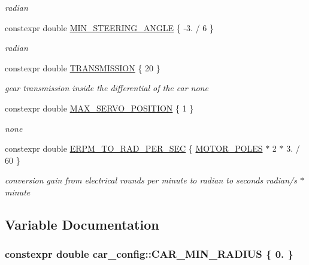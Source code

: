 \begin{DoxyCompactItemize}
\begin{DoxyCompactList}\small\item\em radian \end{DoxyCompactList}\item 
constexpr double \hyperlink{namespacecar__config_a38229ce5d2e17e0c30b86864fb20d9ce}{M\+I\+N\+\_\+\+S\+T\+E\+E\+R\+I\+N\+G\+\_\+\+A\+N\+G\+LE} \{ -\/3. / 6 \}
\begin{DoxyCompactList}\small\item\em radian \end{DoxyCompactList}\item 
constexpr double \hyperlink{namespacecar__config_a7af97a6c9168673aba8917029cfe44d3}{T\+R\+A\+N\+S\+M\+I\+S\+S\+I\+ON} \{ 20 \}
\begin{DoxyCompactList}\small\item\em gear transmission inside the differential of the car  none \end{DoxyCompactList}\item 
constexpr double \hyperlink{namespacecar__config_af1712762f3ad9f8805ba474d5f3e7274}{M\+A\+X\+\_\+\+S\+E\+R\+V\+O\+\_\+\+P\+O\+S\+I\+T\+I\+ON} \{ 1 \}
\begin{DoxyCompactList}\small\item\em none \end{DoxyCompactList}\item 
constexpr double \hyperlink{namespacecar__config_a877c4a772a47f4737d9f03fe8a22e106}{E\+R\+P\+M\+\_\+\+T\+O\+\_\+\+R\+A\+D\+\_\+\+P\+E\+R\+\_\+\+S\+EC} \{ \hyperlink{namespacecar__config_a611a0f02cf52db1d438a2dd53b642cd5}{M\+O\+T\+O\+R\+\_\+\+P\+O\+L\+ES} $\ast$ 2 $\ast$ 3. / 60 \}
\begin{DoxyCompactList}\small\item\em conversion gain from electrical rounds per minute to radian to seconds  radian/s $\ast$ minute \end{DoxyCompactList}\end{DoxyCompactItemize}


\subsection{Variable Documentation}
\subsubsection[{\texorpdfstring{C\+A\+R\+\_\+\+M\+I\+N\+\_\+\+R\+A\+D\+I\+US}{CAR_MIN_RADIUS}}]{\setlength{\rightskip}{0pt plus 5cm}constexpr double car\+\_\+config\+::\+C\+A\+R\+\_\+\+M\+I\+N\+\_\+\+R\+A\+D\+I\+US \{ 0. \}}\hypertarget{namespacecar__config_a15ef5c54eaa890e38deadf5b4243cfb5}{}\label{namespacecar__config_a15ef5c54eaa890e38deadf5b4243cfb5}


